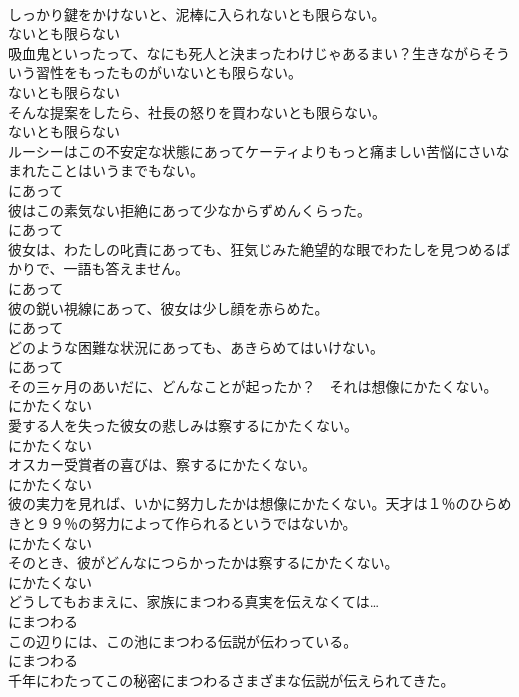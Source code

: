 \documentclass[8pt]{extreport}
\begin{document}
\begin{CJK}{UTF8}{min}
\\	しっかり鍵をかけないと、泥棒に入られないとも限らない。	
\\	ないとも限らない
\\	吸血鬼といったって、なにも死人と決まったわけじゃあるまい？生きながらそういう習性をもったものがいないとも限らない。	
\\	ないとも限らない
\\	そんな提案をしたら、社長の怒りを買わないとも限らない。	
\\	ないとも限らない
\\	ルーシーはこの不安定な状態にあってケーティよりもっと痛ましい苦悩にさいなまれたことはいうまでもない。	
\\	にあって
\\	彼はこの素気ない拒絶にあって少なからずめんくらった。	
\\	にあって
\\	彼女は、わたしの叱責にあっても、狂気じみた絶望的な眼でわたしを見つめるばかりで、一語も答えません。	
\\	にあって
\\	彼の鋭い視線にあって、彼女は少し顔を赤らめた。	
\\	にあって
\\	どのような困難な状況にあっても、あきらめてはいけない。	
\\	にあって
\\	その三ヶ月のあいだに、どんなことが起ったか？　それは想像にかたくない。	
\\	にかたくない
\\	愛する人を失った彼女の悲しみは察するにかたくない。	
\\	にかたくない
\\	オスカー受賞者の喜びは、察するにかたくない。	
\\	にかたくない
\\	彼の実力を見れば、いかに努力したかは想像にかたくない。天才は１％のひらめきと９９％の努力によって作られるというではないか。	
\\	にかたくない
\\	そのとき、彼がどんなにつらかったかは察するにかたくない。	
\\	にかたくない
\\	どうしてもおまえに、家族にまつわる真実を伝えなくては…	
\\	にまつわる
\\	この辺りには、この池にまつわる伝説が伝わっている。	
\\	にまつわる
\\	千年にわたってこの秘密にまつわるさまざまな伝説が伝えられてきた。	

\end{CJK}
\end{document}
